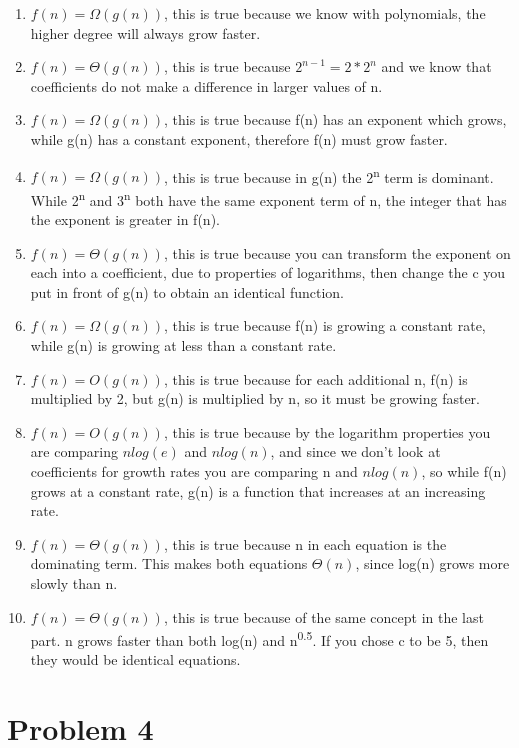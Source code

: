 \documentclass[]{article}
\begin{document}
\begin{enumerate}
\def\labelenumi{\alph{enumi})}
\item
  \(f(n) = \Omega(g(n))\), this is true because we know with
  polynomials, the higher degree will always grow faster.
\item
  \(f(n) = \Theta(g(n))\), this is true because \(2^{n-1} = 2 * 2^n\)
  and we know that coefficients do not make a difference in larger
  values of n.
\item
  \(f(n) = \Omega(g(n))\), this is true because f(n) has an exponent
  which grows, while g(n) has a constant exponent, therefore f(n) must
  grow faster.
\item
  \(f(n) = \Omega(g(n))\), this is true because in g(n) the
  2\textsuperscript{n} term is dominant. While 2\textsuperscript{n} and
  3\textsuperscript{n} both have the same exponent term of n, the
  integer that has the exponent is greater in f(n).
\item
  \(f(n) = \Theta(g(n))\), this is true because you can transform the
  exponent on each into a coefficient, due to properties of logarithms,
  then change the c you put in front of g(n) to obtain an identical
  function.
\item
  \(f(n) = \Omega(g(n))\), this is true because f(n) is growing a
  constant rate, while g(n) is growing at less than a constant rate.
\item
  \(f(n) = O(g(n))\), this is true because for each additional n, f(n)
  is multiplied by 2, but g(n) is multiplied by n, so it must be growing
  faster.
\item
  \(f(n) = O(g(n))\), this is true because by the logarithm properties
  you are comparing \(nlog(e)\) and \(nlog(n)\), and since we don't look
  at coefficients for growth rates you are comparing n and \(nlog(n)\),
  so while f(n) grows at a constant rate, g(n) is a function that
  increases at an increasing rate.
\item
  \(f(n) = \Theta(g(n))\), this is true because n in each equation is
  the dominating term. This makes both equations \(\Theta(n)\), since
  log(n) grows more slowly than n.
\item
  \(f(n) = \Theta(g(n))\), this is true because of the same concept in
  the last part. n grows faster than both log(n) and
  n\textsuperscript{0.5}. If you chose c to be 5, then they would be
  identical equations.
\end{enumerate}

\pagebreak

\section{Problem 4}\label{problem-4}
\end{document}
